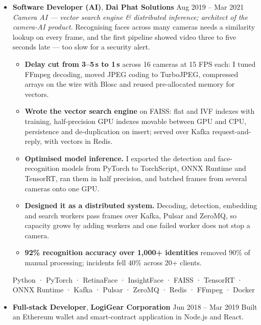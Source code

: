 \documentclass[10pt,a4paper,ragged2e,withhyper]{altacv}
\newcommand{\pastjob}[3]{\textbf{#1}, \textbf{\textcolor{accent}{#2}} \textcolor{accent}{\textbullet} #3\newline}
\newcommand{\win}[1]{\textbf{\textcolor{emphasis}{#1}}}
\begin{document}
\begin{itemize}[leftmargin=*,itemsep=5pt,topsep=1pt,parsep=0pt]
  \item \pastjob{Software Developer (AI)}{Dai Phat Solutions}{Aug 2019 -- Mar 2021}
  \textit{Camera AI --- vector search engine \& distributed inference; architect of the camera-AI product.} Recognising faces across many cameras needs a similarity lookup on every frame, and the first pipeline showed video three to five seconds late --- too slow for a security alert.
  \begin{itemize}[leftmargin=1.1em,itemsep=1pt,topsep=2pt,parsep=0pt,after=\vspace{1pt}]
    \item \win{Delay cut from 3--5\,s to 1\,s} across 16 cameras at 15 FPS each: I tuned FFmpeg decoding, moved JPEG coding to TurboJPEG, compressed arrays on the wire with Blosc and reused pre-allocated memory for vectors.
    \item \win{Wrote the vector search engine} on FAISS: flat and IVF indexes with training, half-precision GPU indexes movable between GPU and CPU, persistence and de-duplication on insert; served over Kafka request-and-reply, with vectors in Redis.
    \item \win{Optimised model inference.} I exported the detection and face-recognition models from PyTorch to TorchScript, ONNX Runtime and TensorRT, ran them in half precision, and batched frames from several cameras onto one GPU.
    \item \win{Designed it as a distributed system.} Decoding, detection, embedding and search workers pass frames over Kafka, Pulsar and ZeroMQ, so capacity grows by adding workers and one failed worker does not stop a camera.
    \item \win{92\% recognition accuracy over 1,000+ identities} removed 90\% of manual processing; incidents fell 40\% across 20+ clients.
  \end{itemize}
  {\scriptsize\textcolor{emphasis}{Python · PyTorch · RetinaFace · InsightFace · FAISS · TensorRT · ONNX Runtime · Kafka · Pulsar · ZeroMQ · Redis · FFmpeg · Docker}}

  \item \pastjob{Full-stack Developer}{LogiGear Corporation}{Jun 2018 -- Mar 2019}
  Built an Ethereum wallet and smart-contract application in Node.js and React.
\end{itemize}

\end{document}
